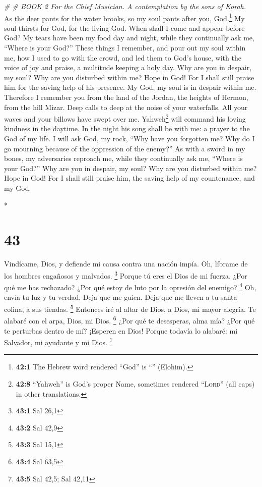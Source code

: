 \begin{paracol}{2}
\begin{otherlanguage}{english}
\emph{\# \# BOOK 2 For the Chief Musician. A contemplation by the sons
of Korah.}\\
 As the deer pants for the water brooks, so my soul pants
after you, God.\footnote{\textbf{42:1} The Hebrew word rendered ``God''
  is ``'' (Elohim).}  My soul thirsts for
God, for the living God. When shall I come and appear before God?
 My tears have been my food day and night, while they
continually ask me, ``Where is your God?''  These things I
remember, and pour out my soul within me, how I used to go with the
crowd, and led them to God's house, with the voice of joy and praise, a
multitude keeping a holy day.  Why are you in despair, my
soul? Why are you disturbed within me? Hope in God! For I shall still
praise him for the saving help of his presence.  My God,
my soul is in despair within me. Therefore I remember you from the land
of the Jordan, the heights of Hermon, from the hill Mizar.
 Deep calls to deep at the noise of your waterfalls. All
your waves and your billows have swept over me. 
Yahweh\footnote{\textbf{42:8} ``Yahweh'' is God's proper Name, sometimes
  rendered ``\textsc{Lord}'' (all caps) in other translations.} will
command his loving kindness in the daytime. In the night his song shall
be with me: a prayer to the God of my life.  I will ask
God, my rock, ``Why have you forgotten me? Why do I go mourning because
of the oppression of the enemy?''  As with a sword in my
bones, my adversaries reproach me, while they continually ask me,
``Where is your God?''  Why are you in despair, my soul?
Why are you disturbed within me? Hope in God! For I shall still praise
him, the saving help of my countenance, and my God.

\end{otherlanguage}

\switchcolumn[0]*

\hypertarget{section-84}{%
\section{43}\label{section-84}}

 Vindícame, Dios, y defiende mi causa contra una nación
impía. Oh, líbrame de los hombres engañosos y malvados. \footnote{\textbf{43:1}
  Sal 26,1}  Porque tú eres el Dios de mi fuerza. ¿Por qué
me has rechazado? ¿Por qué estoy de luto por la opresión del enemigo?
\footnote{\textbf{43:2} Sal 42,9}  Oh, envía tu luz y tu
verdad. Deja que me guíen. Deja que me lleven a tu santa colina, a sus
tiendas. \footnote{\textbf{43:3} Sal 15,1}  Entonces iré
al altar de Dios, a Dios, mi mayor alegría. Te alabaré con el arpa,
Dios, mi Dios. \footnote{\textbf{43:4} Sal 63,5}  ¿Por qué
te desesperas, alma mía? ¿Por qué te perturbas dentro de mí? ¡Esperen en
Dios! Porque todavía lo alabaré: mi Salvador, mi ayudante y mi Dios.
\footnote{\textbf{43:5} Sal 42,5; Sal 42,11}


\end{paracol}

